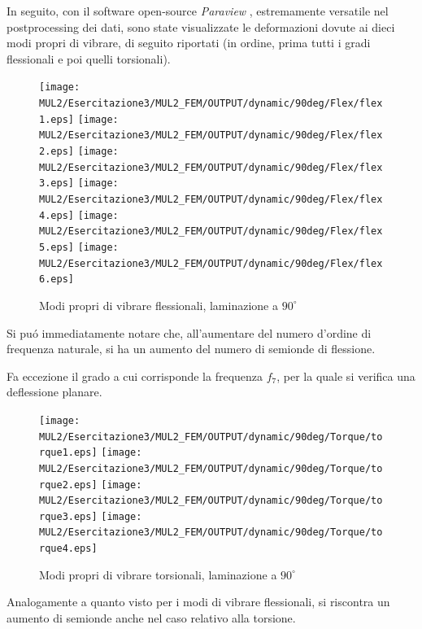\documentclass{article}
\begin{document}
            In seguito, con il software open-source \textit{Paraview} \autocite{Paraview}, estremamente versatile nel postprocessing dei dati, 
            sono state visualizzate le deformazioni dovute ai dieci modi propri di vibrare, di seguito riportati 
            (in ordine, prima tutti i gradi flessionali e poi quelli torsionali). 

            \clearpage

            \begin{figure}[h!]
                 \label{fig:freq_nat_flex_90}
                \texttt{[image: MUL2/Esercitazione3/MUL2\_FEM/OUTPUT/dynamic/90deg/Flex/flex1.eps]}
                \texttt{[image: MUL2/Esercitazione3/MUL2\_FEM/OUTPUT/dynamic/90deg/Flex/flex2.eps]}
                \texttt{[image: MUL2/Esercitazione3/MUL2\_FEM/OUTPUT/dynamic/90deg/Flex/flex3.eps]}
                \texttt{[image: MUL2/Esercitazione3/MUL2\_FEM/OUTPUT/dynamic/90deg/Flex/flex4.eps]}
                \texttt{[image: MUL2/Esercitazione3/MUL2\_FEM/OUTPUT/dynamic/90deg/Flex/flex5.eps]}
                \texttt{[image: MUL2/Esercitazione3/MUL2\_FEM/OUTPUT/dynamic/90deg/Flex/flex6.eps]}
                \caption{Modi propri di vibrare flessionali, laminazione a $90^\circ$}
            \end{figure}

            Si puó immediatamente notare che, all'aumentare del numero d'ordine di frequenza naturale, 
            si ha un aumento del numero di semionde di flessione.

            Fa eccezione il grado a cui corrisponde la frequenza $f_7$, per la quale si verifica una deflessione planare.

            \clearpage

            \begin{figure}[h!]
                 \label{fig:freq_nat_torque_90}
                \texttt{[image: MUL2/Esercitazione3/MUL2\_FEM/OUTPUT/dynamic/90deg/Torque/torque1.eps]}
                \texttt{[image: MUL2/Esercitazione3/MUL2\_FEM/OUTPUT/dynamic/90deg/Torque/torque2.eps]}
                \texttt{[image: MUL2/Esercitazione3/MUL2\_FEM/OUTPUT/dynamic/90deg/Torque/torque3.eps]}
                \texttt{[image: MUL2/Esercitazione3/MUL2\_FEM/OUTPUT/dynamic/90deg/Torque/torque4.eps]}
                \caption{Modi propri di vibrare torsionali, laminazione a $90^\circ$}
            \end{figure}

            Analogamente a quanto visto per i modi di vibrare flessionali, si riscontra un aumento di semionde anche 
            nel caso relativo alla torsione.
\end{document}

